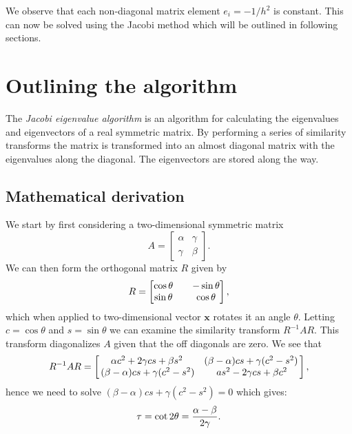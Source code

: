 \documentclass[a4paper, 10pt]{amsart}
\renewcommand{\v}[1]{\mathbf{#1}}
\begin{document}
We observe that each non-diagonal matrix element \( e_i = -1 / h^2 \) is
constant. This can now be solved using the Jacobi method which will be outlined
in following sections.

\section{Outlining the algorithm}
\label{sec:outlining_the_algorithm}

The \emph{Jacobi eigenvalue algorithm} is an algorithm for calculating the
eigenvalues and eigenvectors of a real symmetric matrix. By performing a series
of similarity transforms the matrix is transformed into an almost diagonal
matrix with the eigenvalues along the diagonal. The eigenvectors are stored
along the way.

\subsection{Mathematical derivation}
\label{sub:mathematical_derivation}

We start by first considering a two-dimensional symmetric matrix
\begin{equation}
  A = \begin{bmatrix}
    \alpha & \gamma \\
    \gamma & \beta
  \end{bmatrix}.
\end{equation}
We can then form the orthogonal matrix $R$ given by
\begin{equation}
  \notag
  R = \begin{bmatrix}
    \cos \theta && -\sin\theta \\
    \sin\theta && \cos\theta
  \end{bmatrix},
\end{equation}
which when applied to two-dimensional vector $\v{x}$ rotates it an angle
$\theta$. Letting $c = \cos\theta$ and $s = \sin\theta$ we can examine the
similarity transform $R^{-1}AR$. This transform diagonalizes $A$ given that the
off diagonals are zero. We see that
\begin{equation}
  \label{eq:givens_two}
  \notag
  R^{-1}AR = \begin{bmatrix}
    \alpha c^2 + 2\gamma cs + \beta s^2 & (\beta - \alpha)cs + \gamma(c^2 - s^2)\, \\
    \, (\beta - \alpha)cs + \gamma(c^2 - s^2) & as^2 - 2\gamma cs + \beta c^2
  \end{bmatrix},
\end{equation}
hence we need to solve $(\beta - \alpha)cs + \gamma(c^2 - s^2) = 0$ which
gives:
\begin{equation}
  \notag
  \tau = \cot 2\theta = \frac{\alpha - \beta}{2\gamma}.
\end{equation}
\end{document}
